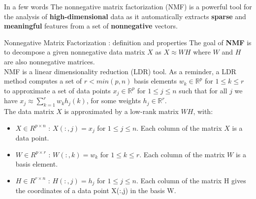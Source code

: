 \documentclass[final]{beamer}
\newlength{\threecolwid}
\newcommand{\real}{\mathbb{R}}
\begin{document}
\begin{frame}
\begin{columns}[t]
\begin{column}{\threecolwid}
\begin{alertblock}{In a few words}
\normalsize
The nonnegative matrix factorization (NMF) is a powerful tool for the analysis of \textbf{high-dimensional} data as it automatically extracts \textbf{sparse} and \textbf{meaningful} features from a set of \textbf{nonnegative} vectors.
\end{alertblock}


\begin{exampleblock}{Nonnegative Matrix Factorization : definition and properties}
The goal of \textbf{NMF} is to decompose a given nonnegative data matrix $X$ as $X \approx W H$ where $W$ and $H$ are also nonnegative matrices.\\
NMF is a linear dimensionality reduction (LDR) tool. As a reminder, a LDR method computes a set of $r < min(p,n)$ basis elements $w_k \in \real^p$ for $1 \leq k \leq r$ to approximate a set of data points $x_j \in \real^{p}$ for $1 \leq j \leq n$ such that for all $j$ we have $x_j \approx \sum_{k = 1}^{r} w_{k} h_{j}(k)$, for some weights $h_j\in \real^r$. \\
The data matrix $X$ is approximated by a low-rank matrix $WH$, with:
     \begin{itemize}
     \item $X \in R^{p \times n}$ : $X(:,j) = x_j$ for $1 \leq j \leq n$. Each column of the matrix $X$ is a data point.
     \item $W \in R^{p \times r}$ : $W(:,k) = w_k$ for $1 \leq k \leq r$. Each column of the matrix $W$ is a basis element.
     \item $H \in R^{r \times n}$ : $H(:,j) = h_j$ for $1 \leq j \leq n$. Each column of the matrix H gives the coordinates of a data point X(:,j) in the basis W.
     \end{itemize}
\end{exampleblock}





\end{column}
\end{columns}
\end{frame}
\end{document}

